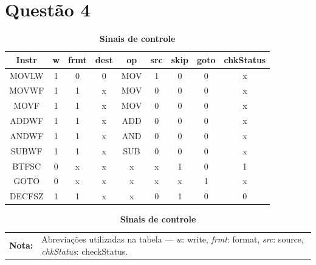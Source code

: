 \documentclass[12pt]{report}
\begin{document}
	\section*{Questão 4}
		\begin{table}[ht]
			\centering
			\begin{tabular}{ccccccccc}
				\toprule
				\textbf{Instr} & \textbf{w} & \textbf{frmt} & \textbf{dest} & \textbf{op} & \textbf{src} & \textbf{skip} & \textbf{goto} & \textbf{chkStatus} \\
				\midrule
				MOVLW & 1 & 0 & 0 & MOV & 1 & 0 & 0 & x \\
				MOVWF & 1 & 1 & x & MOV & 0 & 0 & 0 & x \\
				MOVF & 1 & 1 & x & MOV & 0 & 0 & 0 & x \\
				ADDWF & 1 & 1 & x & ADD & 0 & 0 & 0 & x \\
				ANDWF & 1 & 1 & x & AND & 0 & 0 & 0 & x \\
				SUBWF & 1 & 1 & x & SUB & 0 & 0 & 0 & x \\
				BTFSC & 0 & x & x & x & x & 1 & 0 & 1 \\
				GOTO & 0 & x & x & x & x & x & 1 & x \\
				DECFSZ & 1 & 1 & x & x & 0 & 1 & 0 & 0 \\
				\bottomrule
			\end{tabular}\label{tab:Sinais de controle}
			\begin{tabularx}{\textwidth}{l X}
				\textbf{Nota:} & Abreviações utilizadas na tabela --- \textit{w}: write, \textit{frmt}: format, \textit{src}: source, \textit{chkStatus}: checkStatus.
			\end{tabularx}
			\caption{\textbf{Sinais de controle}}
			\label{sinais de controle}
		\end{table}
\end{document}
